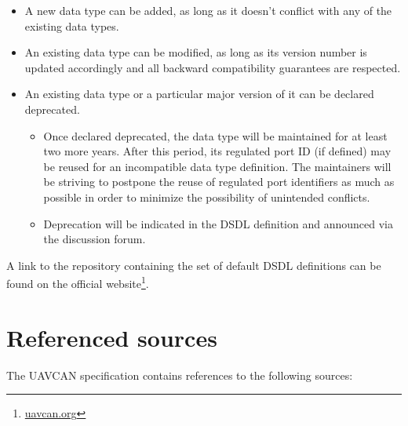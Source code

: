 \begin{itemize}
    \item A new data type can be added, as long as it doesn't conflict with any of the existing data types.

    \item An existing data type can be modified, as long as its version number is updated accordingly
    and all backward compatibility guarantees are respected.

    \item An existing data type or a particular major version of it can be declared deprecated.
    \begin{itemize}
        \item Once declared deprecated, the data type will be maintained for at least two more years.
        After this period, its regulated port ID (if defined) may be reused for an incompatible data type definition.
        The maintainers will be striving to postpone the reuse of regulated port identifiers as much as
        possible in order to minimize the possibility of unintended conflicts.

        \item Deprecation will be indicated in the DSDL definition and announced via the discussion forum.
    \end{itemize}
\end{itemize}

A link to the repository containing the set of default DSDL definitions can be found on the official
website\footnote{\href{http://uavcan.org}{uavcan.org}}.

\section{Referenced sources}

The UAVCAN specification contains references to the following sources:

